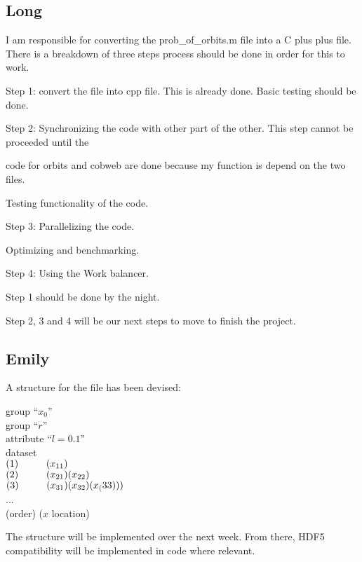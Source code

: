 \documentclass[12pt]{article}
\begin{document}
\subsection{Long}
I am responsible for converting the prob\_of\_orbits.m file into a C plus plus file. There is a breakdown of three steps process should be done in order for this to work.

Step 1: convert the file into cpp file. This is already done. Basic testing should be done.

Step 2: Synchronizing the code with other part of the other. This step cannot be proceeded until the 

code for orbits and cobweb are done because my function is depend on the two files. 

Testing functionality of the code.

Step 3: Parallelizing the code. 

Optimizing and benchmarking. 

Step 4: Using the Work balancer.

Step 1 should be done by the night.

Step 2, 3 and 4 will be our next steps to move to finish the project.
\subsection{Emily}
A structure for the file has been devised:
\begin{tabbing}
	\hspace{5mm} group ``$x_{0}$'' \\
		\hspace{10mm} group ``$r$'' \\
			\hspace{15mm} attribute ``$l=0.1$'' \\
				\hspace{20mm} dataset \\
					\hspace{25mm} $(1) \hspace{10mm} (x_{11})$ \\
					\hspace{25mm} $(2) \hspace{10mm} (x_{21})(x_{22})$ \\
					\hspace{25mm} $(3) \hspace{10mm} (x_{31})(x_{32})(x_(33)))$ \\
					\hspace{25mm} ... \\
					\hspace{25mm} (order) ($x$ location) \\	
\end{tabbing}
The structure will be implemented over the next week. From there, HDF5 compatibility will be implemented in code where relevant.




\end{document}
